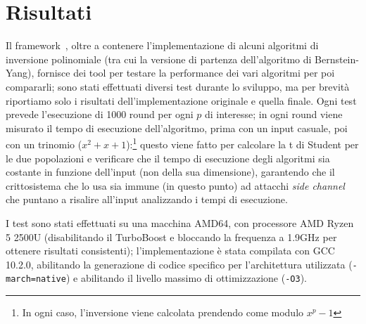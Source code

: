\section{Risultati}
Il framework~\cite{benchmark}, oltre a contenere l'implementazione di alcuni algoritmi di inversione polinomiale
(tra cui la versione di partenza dell'algoritmo di Bernstein-Yang), fornisce dei tool per testare la performance dei
vari algoritmi per poi compararli; sono stati effettuati diversi test durante lo sviluppo, ma per brevità riportiamo solo
i risultati dell'implementazione originale e quella finale.
Ogni test prevede l'esecuzione di 1000 round per ogni $p$ di interesse; in ogni round viene misurato il tempo di esecuzione
dell'algoritmo, prima con un input casuale, poi con un trinomio ($x^2+x+1$):\footnote{In ogni caso, l'inversione
viene calcolata prendendo come modulo $x^{p}-1$} questo viene fatto per calcolare la t
di Student per le due popolazioni e verificare
che il tempo di esecuzione degli algoritmi sia costante in funzione dell'input (non della sua dimensione), garantendo che
il crittosistema che lo usa sia immune (in questo punto) ad attacchi \textit{side channel} che puntano a risalire all'input
analizzando i tempi di esecuzione.

I test sono stati effettuati su una macchina AMD64, con processore AMD Ryzen 5 2500U (disabilitando il TurboBoost e
bloccando la frequenza a 1.9GHz per ottenere risultati consistenti); l'implementazione è stata compilata con GCC 10.2.0, 
abilitando la generazione di codice specifico per l'architettura utilizzata (\texttt{-march=native}) e abilitando il livello
massimo di ottimizzazione (\texttt{-O3}).

